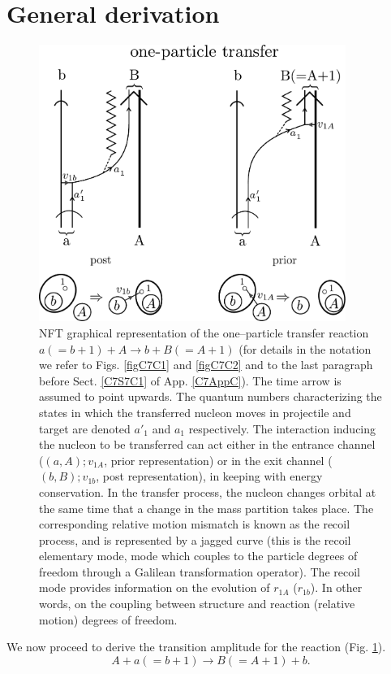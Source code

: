 \section{General derivation}\label{C4S1}
\begin{figure}
\centerline{\includegraphics*[width=10cm,angle=0]{C6/figs_C6/Reaction3}}
\caption{NFT graphical representation of the one--particle transfer reaction $a(=b+1)+A\rightarrow b+B(=A+1)$ (for details in the notation we refer to Figs. \ref{figC7C1} and \ref{figC7C2} and to the last paragraph before Sect. \ref{C7S7C1} of App. \ref{C7AppC}). The time arrow is assumed to point upwards. The quantum numbers characterizing the states in which the transferred nucleon moves in projectile and target are denoted $a'_1$ and $a_1$ respectively. The interaction inducing the nucleon to be transferred can act either in the entrance channel ($(a,A);v_{1A}$, prior representation) or in the exit channel ($(b,B);v_{1b}$, post representation), in keeping with energy conservation. In the transfer process, the nucleon changes orbital at the same time that a change in the mass partition takes place. The corresponding relative motion mismatch is known as the recoil process, and is represented by a jagged curve (this is the recoil elementary mode, mode which couples to the particle degrees of freedom through a Galilean transformation operator). The recoil mode  provides information on the evolution of $r_{1A}$ ($r_{1b}$). In other words, on the coupling between structure and reaction (relative motion) degrees of freedom.}\label{fig6.1.1}
\end{figure}
We now proceed to derive the transition amplitude for the reaction (Fig. \ref{fig6.1.1}). 
\begin{equation}\label{eq_onept1}
    A+a(=b+1)\longrightarrow B(=A+1)+b.
\end{equation}
